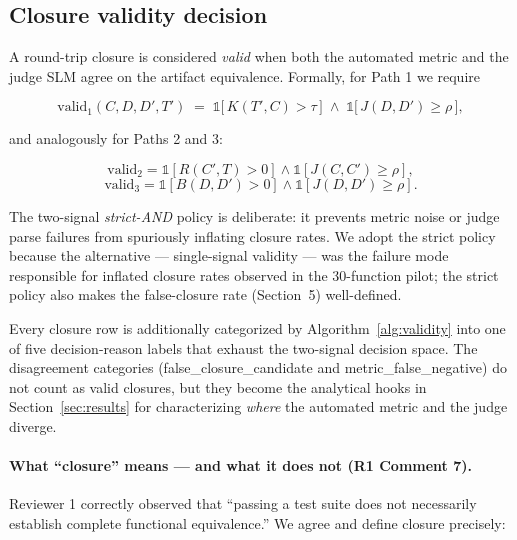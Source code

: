 \subsection{Closure validity decision}

A round-trip closure is considered \emph{valid} when both the automated metric and the judge SLM agree on the artifact equivalence. Formally, for Path 1 we require

\begin{equation}
  \text{valid}_1(C, D, D', T')
  \;=\;
  \mathds{1}\!\bigl[\, K(T', C) > \tau \,\bigr]
  \;\wedge\;
  \mathds{1}\!\bigl[\, J(D, D') \geq \rho \,\bigr],
  \label{eq:valid1}
\end{equation}

and analogously for Paths 2 and 3:

\begin{equation}
  \text{valid}_2 = \mathds{1}[R(C', T) > 0] \wedge \mathds{1}[J(C, C') \geq \rho],
  \label{eq:valid2}
\end{equation}
\begin{equation}
  \text{valid}_3 = \mathds{1}[B(D, D') > 0] \wedge \mathds{1}[J(D, D') \geq \rho].
  \label{eq:valid3}
\end{equation}

The two-signal \emph{strict-AND} policy is deliberate: it prevents metric noise or judge parse failures from spuriously inflating closure rates. We adopt the strict policy because the alternative --- single-signal validity --- was the failure mode responsible for inflated closure rates observed in the 30-function pilot; the strict policy also makes the false-closure rate (Section~5) well-defined.

Every closure row is additionally categorized by Algorithm~\ref{alg:validity} into one of five decision-reason labels that exhaust the two-signal decision space. The disagreement categories (\textsf{false\_closure\_candidate} and \textsf{metric\_false\_negative}) do not count as valid closures, but they become the analytical hooks in Section~\ref{sec:results} for characterizing \emph{where} the automated metric and the judge diverge.

\paragraph{What ``closure'' means --- and what it does not (R1 Comment 7).}
Reviewer 1 correctly observed that ``passing a test suite does not necessarily establish complete functional equivalence.'' We agree and define closure precisely:

